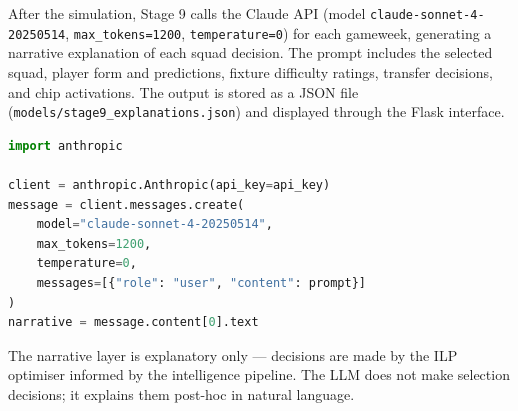 After the simulation, Stage 9 calls the Claude API (model \texttt{claude-sonnet-4-20250514}, \texttt{max\_tokens=1200}, \texttt{temperature=0}) for each gameweek, generating a narrative explanation of each squad decision. The prompt includes the selected squad, player form and predictions, fixture difficulty ratings, transfer decisions, and chip activations. The output is stored as a JSON file (\texttt{models/stage9\_explanations.json}) and displayed through the Flask interface.

\begin{lstlisting}[language=Python, caption=Stage 9 Claude API call for narrative generation]
import anthropic

client = anthropic.Anthropic(api_key=api_key)
message = client.messages.create(
    model="claude-sonnet-4-20250514",
    max_tokens=1200,
    temperature=0,
    messages=[{"role": "user", "content": prompt}]
)
narrative = message.content[0].text
\end{lstlisting}

The narrative layer is explanatory only — decisions are made by the ILP optimiser informed by the intelligence pipeline. The LLM does not make selection decisions; it explains them post-hoc in natural language.
